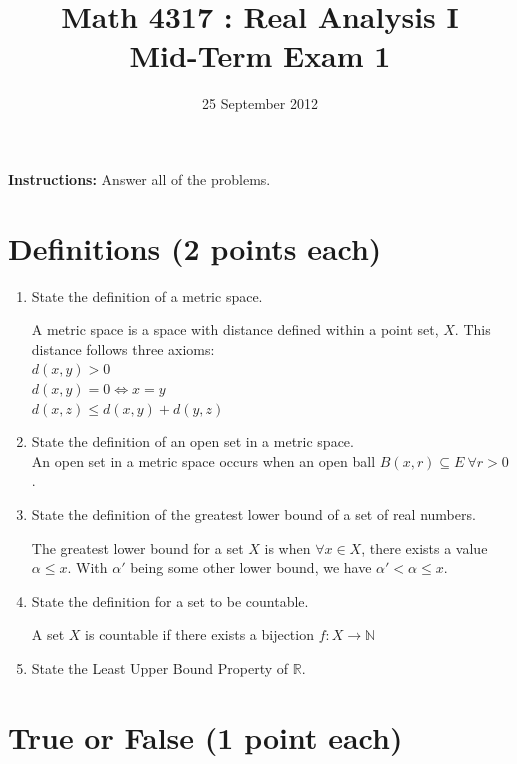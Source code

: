 \documentclass[11pt]{article}
\title{Math 4317 : Real Analysis I \\ Mid-Term Exam 1}
\date{25 September 2012}
\author{}
\newcommand{\defspace}{\vspace{1.5in}}
\begin{document}
\maketitle

\noindent \textbf{Instructions:} Answer all of the problems.

\section*{Definitions (2 points each)}

\begin{enumerate}
    \item State the definition of a metric space.
    

    A metric space is a space with distance defined within a point set, $X$. This distance follows three axioms:
    \\ 
    $d(x,y) > 0$
    \\
    $d(x,y) = 0 \Longleftrightarrow x = y$ 
    \\
    $d(x,z) \leq d(x,y) + d(y,z)$
    \item State the definition of an open set in a metric space. \\ 
    An open set in a metric space occurs when an open ball $B(x,r) \subseteq E \ \forall r > 0 $. 

    \item State the definition of the greatest lower bound of a set of real numbers.
    
    The greatest lower bound for a set $X$ is when $\forall x \in X$, there exists a value $\alpha \leq x$. With $\alpha'$ being some other lower bound, we have $\alpha ' < \alpha \leq x$.

    \item State the definition for a set to be countable.
    
    A set $X$ is countable if there exists a bijection $f: X \rightarrow \mathbb{N}$

    \item State the Least Upper Bound Property of $\mathbb{R}$.
    \defspace
\end{enumerate}

\newpage
\section*{True or False (1 point each)}
\end{document}
